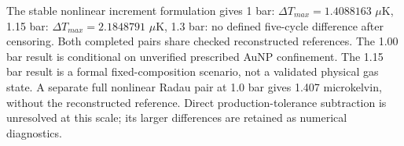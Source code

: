 The stable nonlinear increment formulation gives 1 bar: $\Delta T_{max}=1.4088163$ $\mu$K, 1.15 bar: $\Delta T_{max}=2.1848791$ $\mu$K, 1.3 bar: no defined five-cycle difference after censoring. Both completed pairs share checked reconstructed references. The 1.00 bar result is conditional on unverified prescribed AuNP confinement. The 1.15 bar result is a formal fixed-composition scenario, not a validated physical gas state. A separate full nonlinear Radau pair at 1.0 bar gives 1.407 microkelvin, without the reconstructed reference. Direct production-tolerance subtraction is unresolved at this scale; its larger differences are retained as numerical diagnostics.
